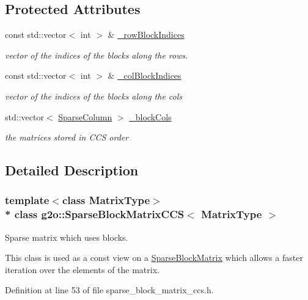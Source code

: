 \subsection*{Protected Attributes}
\begin{DoxyCompactItemize}
\item 
const std\+::vector$<$ int $>$ \& \hyperlink{classg2o_1_1SparseBlockMatrixCCS_afabda9a2efe5ea9efb5a1e5312f6e307}{\+\_\+row\+Block\+Indices}
\begin{DoxyCompactList}\small\item\em vector of the indices of the blocks along the rows. \end{DoxyCompactList}\item 
const std\+::vector$<$ int $>$ \& \hyperlink{classg2o_1_1SparseBlockMatrixCCS_ae31426bfb6b31bd0fd72de2e18dd5a35}{\+\_\+col\+Block\+Indices}
\begin{DoxyCompactList}\small\item\em vector of the indices of the blocks along the cols \end{DoxyCompactList}\item 
std\+::vector$<$ \hyperlink{classg2o_1_1SparseBlockMatrixCCS_a4fc5dfe0a9ff9bd62065ca4b17f25bc1}{Sparse\+Column} $>$ \hyperlink{classg2o_1_1SparseBlockMatrixCCS_ab6b173607380a367cc1cd67442c1c3e2}{\+\_\+block\+Cols}
\begin{DoxyCompactList}\small\item\em the matrices stored in C\+CS order \end{DoxyCompactList}\end{DoxyCompactItemize}


\subsection{Detailed Description}
\subsubsection*{template$<$class Matrix\+Type$>$\\*
class g2o\+::\+Sparse\+Block\+Matrix\+C\+C\+S$<$ Matrix\+Type $>$}

Sparse matrix which uses blocks. 

This class is used as a const view on a \hyperlink{classg2o_1_1SparseBlockMatrix}{Sparse\+Block\+Matrix} which allows a faster iteration over the elements of the matrix. 

Definition at line 53 of file sparse\+\_\+block\+\_\+matrix\+\_\+ccs.\+h.



